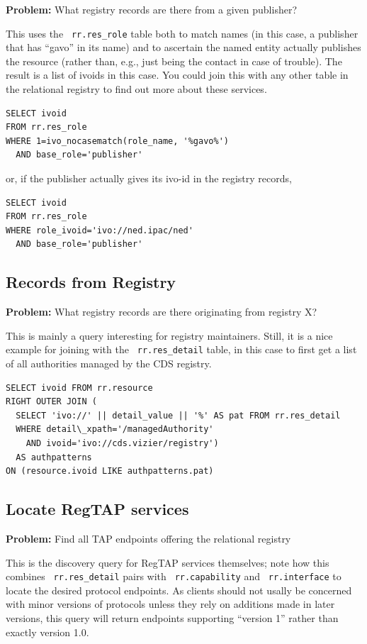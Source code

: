 \documentclass[11pt,a4paper]{ivoa}
\newcommand{\rtent}[1]{\texttt{\color{rtcolor} #1}}
\begin{document}
\textbf{Problem:} What registry records are there from a given
publisher?

This uses the 
\rtent{rr.res\_role}
 table both to
match names (in this case, a publisher that has ``gavo'' in its name) and
to ascertain the named entity actually publishes the resource (rather
than, e.g., just being the contact in case of trouble).  The result is a
list of ivoids in this case.  You could join this with any other
table in the relational registry to find out more about these
services.


\begin{verbatim}
SELECT ivoid 
FROM rr.res_role
WHERE 1=ivo_nocasematch(role_name, '%gavo%')
  AND base_role='publisher'
\end{verbatim}

or, if the publisher actually gives its ivo-id in the registry
records,


\begin{verbatim}
SELECT ivoid 
FROM rr.res_role
WHERE role_ivoid='ivo://ned.ipac/ned'
  AND base_role='publisher'
\end{verbatim}

\subsection{Records from Registry}

\textbf{Problem:} What registry records are
there originating from registry X?

This is mainly a query interesting for registry maintainers.  Still,
it is a nice example for joining with the
\rtent{rr.res\_detail} table, in this case to
first get a list of all authorities managed by the CDS registry.


\begin{verbatim}
SELECT ivoid FROM rr.resource
RIGHT OUTER JOIN (
  SELECT 'ivo://' || detail_value || '%' AS pat FROM rr.res_detail
  WHERE detail\_xpath='/managedAuthority' 
    AND ivoid='ivo://cds.vizier/registry') 
  AS authpatterns
ON (resource.ivoid LIKE authpatterns.pat)
\end{verbatim}

\subsection{Locate RegTAP services}

\textbf{Problem:} Find all TAP endpoints offering the relational
registry

This is the discovery query for RegTAP services themselves;  note how
this combines 
\rtent{rr.res\_detail} pairs with
\rtent{rr.capability}
and 
\rtent{rr.interface} to locate the desired protocol
endpoints.  As clients should not usally be concerned with minor
versions of protocols unless  they rely on additions made in later
versions, this query will return endpoints supporting ``version 1'' rather
than exactly version 1.0.
\end{document}
